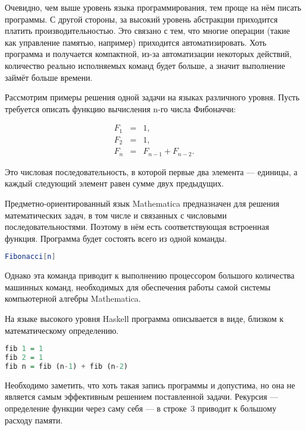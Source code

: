 Очевидно, чем выше уровень языка программирования, тем проще на нём
писать программы. С другой стороны, за высокий уровень абстракции
приходится платить производительностью. Это связано с тем, что многие
операции (такие как управление памятью, например) приходится
автоматизировать. Хоть программа и получается компактной, из-за
автоматизации некоторых действий, количество реально исполняемых
команд будет больше, а значит выполнение займёт больше времени.


Рассмотрим примеры решения одной задачи на языках различного уровня.
Пусть требуется описать функцию вычисления n-го числа Фибоначчи:

\begin{eqnarray*}
F_{1} & = & 1,\\
F_{2} & = & 1,\\
F_{n} & = & F_{n-1}+F_{n-2}.
\end{eqnarray*}

Это числовая последовательность, в которой первые два элемента —
единицы, а каждый следующий элемент равен сумме двух предыдущих.

Предметно-ориентированный язык Mathematica предназначен для решения
математических задач, в том числе и связанных с числовыми
последовательностями. Поэтому в нём есть соответствующая встроенная
функция. Программа будет состоять всего из одной команды.

\begin{lstlisting}[language=Mathematica]
Fibonacci[n]
\end{lstlisting}

Однако эта команда приводит к выполнению процессором большого
количества машинных команд, необходимых для обеспечения работы самой
системы компьютерной алгебры Mathematica.


На языке высокого уровня Haskell программа описывается в виде, близком
к математическому определению.

\begin{lstlisting}[language=Haskell]
fib 1 = 1
fib 2 = 1
fib n = fib (n-1) + fib (n-2)
\end{lstlisting}

Необходимо заметить, что хоть такая запись программы и допустима, но
она не является самым эффективным решением поставленной задачи.
Рекурсия — определение функции через саму себя — в строке~3 приводит к
большому расходу памяти.

